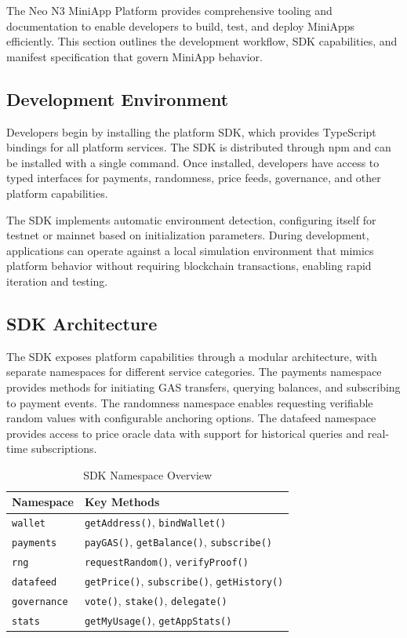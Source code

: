 \documentclass[11pt,a4paper]{article}
\begin{document}
The Neo N3 MiniApp Platform provides comprehensive tooling and documentation to enable developers to build, test, and deploy MiniApps efficiently. This section outlines the development workflow, SDK capabilities, and manifest specification that govern MiniApp behavior.

\subsection{Development Environment}

Developers begin by installing the platform SDK, which provides TypeScript bindings for all platform services. The SDK is distributed through npm and can be installed with a single command. Once installed, developers have access to typed interfaces for payments, randomness, price feeds, governance, and other platform capabilities.

The SDK implements automatic environment detection, configuring itself for testnet or mainnet based on initialization parameters. During development, applications can operate against a local simulation environment that mimics platform behavior without requiring blockchain transactions, enabling rapid iteration and testing.

\subsection{SDK Architecture}

The SDK exposes platform capabilities through a modular architecture, with separate namespaces for different service categories. The payments namespace provides methods for initiating GAS transfers, querying balances, and subscribing to payment events. The randomness namespace enables requesting verifiable random values with configurable anchoring options. The datafeed namespace provides access to price oracle data with support for historical queries and real-time subscriptions.

\begin{table}[h]
\centering
\caption{SDK Namespace Overview}
\begin{tabular}{@{}lp{7cm}@{}}
\toprule
\textbf{Namespace} & \textbf{Key Methods} \\
\midrule
\texttt{wallet} & \texttt{getAddress()}, \texttt{bindWallet()} \\
\texttt{payments} & \texttt{payGAS()}, \texttt{getBalance()}, \texttt{subscribe()} \\
\texttt{rng} & \texttt{requestRandom()}, \texttt{verifyProof()} \\
\texttt{datafeed} & \texttt{getPrice()}, \texttt{subscribe()}, \texttt{getHistory()} \\
\texttt{governance} & \texttt{vote()}, \texttt{stake()}, \texttt{delegate()} \\
\texttt{stats} & \texttt{getMyUsage()}, \texttt{getAppStats()} \\
\bottomrule
\end{tabular}
\label{tab:sdk-namespaces}
\end{table}
\end{document}
